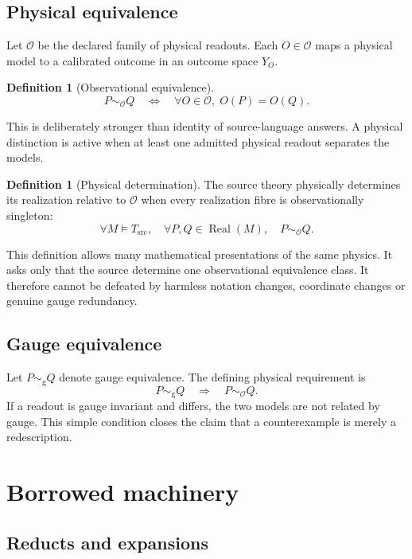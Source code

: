 \documentclass[10pt,a4paper]{article}
\theoremstyle{definition}
\newtheorem{definition}[theorem]{Definition}
\theoremstyle{remark}
\newcommand{\Tsrc}{T_{\mathrm{src}}}
\newcommand{\Obs}{\mathcal O}
\newcommand{\Real}{\operatorname{Real}}
\newcommand{\obsim}{\sim_{\Obs}}
\newcommand{\gaugesim}{\sim_{\mathrm g}}
\begin{document}
\subsection{Physical equivalence}

Let \(\Obs\) be the declared family of physical readouts.  Each
\(O\in\Obs\) maps a physical model to a calibrated outcome in an outcome
space \(Y_O\).

\begin{definition}[Observational equivalence]
\[
P\obsim Q
\quad\Longleftrightarrow\quad
\forall O\in\Obs,\;O(P)=O(Q).
\]
\end{definition}

This is deliberately stronger than identity of source-language answers.  A
physical distinction is active when at least one admitted physical readout
separates the models.

\begin{definition}[Physical determination]
The source theory physically determines its realization relative to \(\Obs\)
when every realization fibre is observationally singleton:
\[
\forall M\models\Tsrc,\quad
\forall P,Q\in\Real(M),\quad P\obsim Q.
\]
\end{definition}

This definition allows many mathematical presentations of the same physics.
It asks only that the source determine one observational equivalence class.
It therefore cannot be defeated by harmless notation changes, coordinate
changes or genuine gauge redundancy.

\subsection{Gauge equivalence}

Let \(P\gaugesim Q\) denote gauge equivalence.  The defining physical
requirement is
\begin{equation}
\label{eq:gauge-preserves}
P\gaugesim Q\quad\Longrightarrow\quad P\obsim Q.
\end{equation}
If a readout is gauge invariant and differs, the two models are not related by
gauge.  This simple condition closes the claim that a counterexample is merely
a redescription.

\section{Borrowed machinery}

\subsection{Reducts and expansions}
\end{document}
